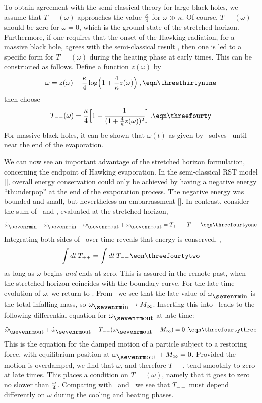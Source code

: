 To obtain agreement with the semi-classical theory for large black
holes, we assume that $T_{--}(\omega)$ approaches the value ${\kappa
\over 4}$ for $\omega \gg \kappa$.  Of course, $T_{--}(\omega)$
should be zero for $\omega = 0$, which is the ground state of the
stretched horizon.  Furthermore, if one requires that the onset of
the Hawking radiation, for a massive black hole, agrees with the
semi-classical result \threeeighteen , then one is led to a specific
form for $T_{--}(\omega)$ during the heating phase at early times.
This can be constructed as follows.  Define a function $z(\omega)$ by
$$
\omega = z(\omega) - {\kappa \over 4} \log \Bigl( 1
+ {4 \over \kappa}z(\omega) \Bigr) \>,
\eqn\threethirtynine
$$
then choose
$$
T_{--}(\omega) = {\kappa \over 4} \Bigl[ 1 - {1
\over (1 + {4\over \kappa}z(\omega))^2} \Bigr] \>.
\eqn\threefourty
$$
For massive black holes, it can be shown that $\omega(t)$ as given by
\threetwentynine\ solves \threethirtyeight\ until near the end of the
evaporation.

We can now see an important advantage of the stretched horizon
formulation, concerning the endpoint of Hawking evaporation.  In the
semi-classical RST model [\RSTtwo], overall energy conservation could
only be achieved by having a negative energy ``thunderpop'' at the
end of the evaporation process.  The negative energy was bounded and
small, but nevertheless an embarrassment [\past].  In contrast,
consider the sum of \threethirtyfour\ and \threethirtyfive ,
evaluated at the stretched horizon,
$$
{\dot \omega}_{\inn} - {\ddot \omega}_{\inn}
+{\dot \omega}_{\out} + {\ddot \omega}_{\out}
= T_{++} - T_{--} \>.
\eqn\threefourtyone
$$
Integrating both sides of \threefourtyone\ over time reveals that
energy is conserved, \ie ,
$$
\int dt \> T_{++} = \int dt \> T_{--}
\eqn\threefourtytwo
$$
as long as $\omega$ begins {\it and\/} ends at zero.  This is assured
in the remote past, when the stretched horizon coincides with the
boundary curve.  For the late time evolution of $\omega$, we return
to \threethirtyeight .  From \threethirty\ we see that the late value
of $\omega_{\inn}$ is the total infalling mass, so $\omega_{\inn}
\rightarrow M_{\infty}$.  Inserting this into \threethirtyeight\
leads to the following differential equation for $\omega_{\out}$ at
late time:
$$
{\ddot \omega}_{\out} + {\dot \omega}_{\out}
+ T_{--}(\omega_{\out} + M_{\infty}) = 0 \>.
\eqn\threefourtythree
$$
This is the equation for the damped motion of a particle subject to a
restoring force, with equilibrium position at $\omega_{\out} +
M_{\infty} = 0$.  Provided the motion is overdamped, we find that
$\omega$, and therefore $T_{--}$, tend smoothly to zero at late
times.  This places a condition on $T_{--}(\omega)$, namely that it
goes to zero no slower than ${\omega \over 4}$.  Comparing with
\threethirtynine\ and \threefourty\ we see that $T_{--}$ must depend
differently on $\omega$ during the cooling and heating phases.

